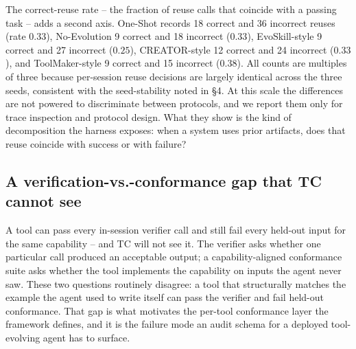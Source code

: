 \documentclass[sigconf,anonymous,natbib=false]{acmart}
\begin{document}
The correct-reuse rate -- the fraction of reuse calls that coincide with a passing task -- adds a second axis. One-Shot records 18 correct and 36 incorrect reuses (rate $0.33$), No-Evolution 9 correct and 18 incorrect ($0.33$), EvoSkill-style 9 correct and 27 incorrect ($0.25$), CREATOR-style 12 correct and 24 incorrect ($0.33$), and ToolMaker-style 9 correct and 15 incorrect ($0.38$). All counts are multiples of three because per-session reuse decisions are largely identical across the three seeds, consistent with the seed-stability noted in \S4. At this scale the differences are not powered to discriminate between protocols, and we report them only for trace inspection and protocol design. What they show is the kind of decomposition the harness exposes: when a system uses prior artifacts, does that reuse coincide with success or with failure?

\subsection{A verification-vs.-conformance gap that TC cannot see}
\label{sec:gap}

A tool can pass every in-session verifier call and still fail every held-out input for the same capability -- and TC will not see it. The verifier asks whether one particular call produced an acceptable output; a capability-aligned conformance suite asks whether the tool implements the capability on inputs the agent never saw. These two questions routinely disagree: a tool that structurally matches the example the agent used to write itself can pass the verifier and fail held-out conformance. That gap is what motivates the per-tool conformance layer the framework defines, and it is the failure mode an audit schema for a deployed tool-evolving agent has to surface.
\end{document}
